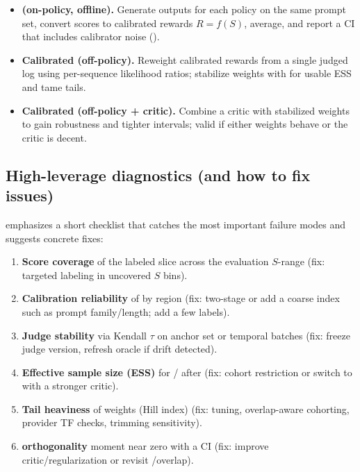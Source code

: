 \begin{itemize}
\item \textbf{\dm{} (on-policy, offline).} Generate outputs for each policy on the same prompt set, convert scores to calibrated rewards $R = f(S)$, average, and report a CI that includes calibrator noise (\oua).

\item \textbf{Calibrated \ips{} (off-policy).} Reweight calibrated rewards from a single judged log using per-sequence likelihood ratios; stabilize weights with \simcal{} for usable ESS and tame tails.

\item \textbf{Calibrated \dr{} (off-policy + critic).} Combine a critic with stabilized weights to gain robustness and tighter intervals; valid if either weights behave or the critic is decent.
\end{itemize}

\subsection{High-leverage diagnostics (and how to fix issues)}

\cje{} emphasizes a short checklist that catches the most important failure modes and suggests concrete fixes:

\begin{enumerate}[label=(\alph*)]
\item \textbf{Score coverage} of the labeled slice across the evaluation $S$-range (fix: targeted labeling in uncovered $S$ bins).

\item \textbf{Calibration reliability} of \autocal{} by region (fix: two-stage \autocal{} or add a coarse index such as prompt family/length; add a few labels).

\item \textbf{Judge stability} via Kendall $\tau$ on anchor set or temporal batches (fix: freeze judge version, refresh oracle if drift detected).

\item \textbf{Effective sample size (ESS)} for \ips/\dr{} after \simcal{} (fix: cohort restriction or switch to \dr{} with a stronger critic).

\item \textbf{Tail heaviness} of weights (Hill index) (fix: \simcal{} tuning, overlap-aware cohorting, provider TF checks, trimming sensitivity).

\item \textbf{\dr{} orthogonality} moment near zero with a CI (fix: improve critic/regularization or revisit \simcal/overlap).
\end{enumerate}

